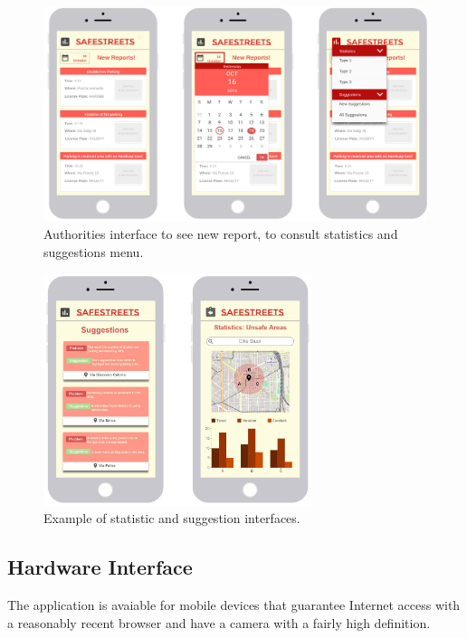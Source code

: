 \documentclass{report}
\begin{document}
\begin{figure}[!ht]
	\begin{center}
	\includegraphics[width=\textwidth]{img/final.png}
	\end{center}
	\caption{Authorities interface to see new report, to consult statistics and suggestions menu.}
	\vfill
\end{figure}
\clearpage
\begin{figure}[!ht]
	\begin{center}
	\includegraphics[width=0.7\textwidth]{img/StatisticsInterfaces.jpg}
	\end{center}
	\caption{Example of statistic and suggestion interfaces.}
\end{figure}

\subsection{Hardware Interface}
The application is avaiable for mobile devices that guarantee Internet access with a reasonably recent browser and have a camera with a fairly high definition.
\end{document}
